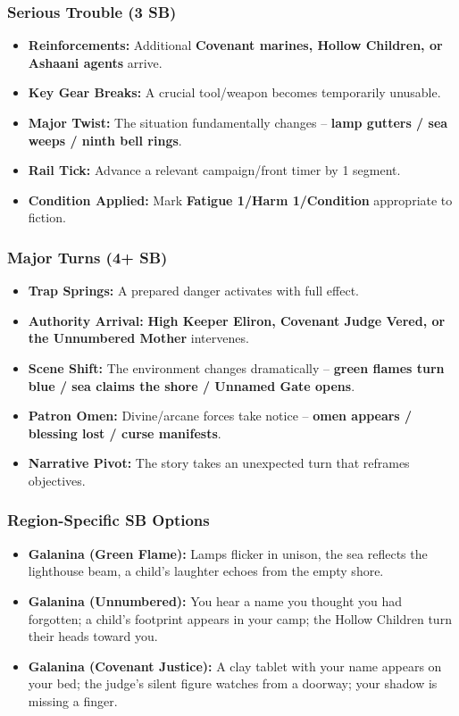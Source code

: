 \subsubsection*{Serious Trouble (3 SB)}
\begin{itemize}
\item \textbf{Reinforcements:} Additional \textbf{Covenant marines, Hollow Children, or Ashaani agents} arrive.
\item \textbf{Key Gear Breaks:} A crucial tool/weapon becomes temporarily unusable.
\item \textbf{Major Twist:} The situation fundamentally changes -- \textbf{lamp gutters / sea weeps / ninth bell rings}.
\item \textbf{Rail Tick:} Advance a relevant campaign/front timer by 1 segment.
\item \textbf{Condition Applied:} Mark \textbf{Fatigue 1/Harm 1/Condition} appropriate to fiction.
\end{itemize}

\subsubsection*{Major Turns (4+ SB)}
\begin{itemize}
\item \textbf{Trap Springs:} A prepared danger activates with full effect.
\item \textbf{Authority Arrival:} \textbf{High Keeper Eliron, Covenant Judge Vered, or the Unnumbered Mother} intervenes.
\item \textbf{Scene Shift:} The environment changes dramatically -- \textbf{green flames turn blue / sea claims the shore / Unnamed Gate opens}.
\item \textbf{Patron Omen:} Divine/arcane forces take notice -- \textbf{omen appears / blessing lost / curse manifests}.
\item \textbf{Narrative Pivot:} The story takes an unexpected turn that reframes objectives.
\end{itemize}

\subsubsection*{Region-Specific SB Options}
\begin{itemize}
\item \textbf{Galanina (Green Flame):} Lamps flicker in unison, the sea reflects the lighthouse beam, a child's laughter echoes from the empty shore.
\item \textbf{Galanina (Unnumbered):} You hear a name you thought you had forgotten; a child's footprint appears in your camp; the Hollow Children turn their heads toward you.
\item \textbf{Galanina (Covenant Justice):} A clay tablet with your name appears on your bed; the judge's silent figure watches from a doorway; your shadow is missing a finger.
\end{itemize}

